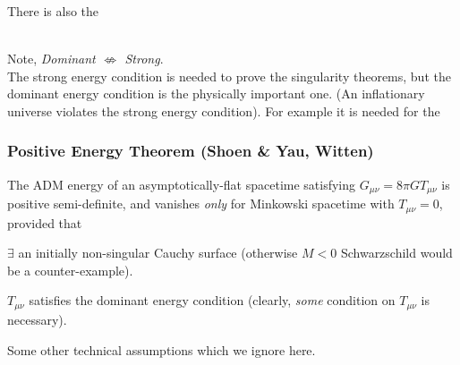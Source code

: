 There is also the 

\\

Note, \emph{Dominant $\not\Leftrightarrow$ Strong}. \\


The strong energy condition is needed to prove the singularity theorems, but 
the dominant energy condition is the physically important one.  (An inflationary
universe violates the strong energy condition).  For example it is needed for 
the

\subsubsection{Positive Energy Theorem (Shoen \& Yau, Witten)}

The ADM energy of an asymptotically-flat spacetime satisfying 
$G_{\mu\nu}=8\pi GT_{\mu\nu}$ is positive semi-definite, and vanishes
\emph{only} for Minkowski spacetime with $T_{\mu\nu}=0$, provided that 
\begin{list}{)}
{}
\item $\exists$ an initially non-singular Cauchy surface (otherwise 
$M<0$ Schwarzschild would be a counter-example).

\item $T_{\mu\nu}$ satisfies the dominant energy condition (clearly, 
\emph{some} condition on $T_{\mu\nu}$ is necessary).

\item Some other technical assumptions which we ignore here.
\end{list}
